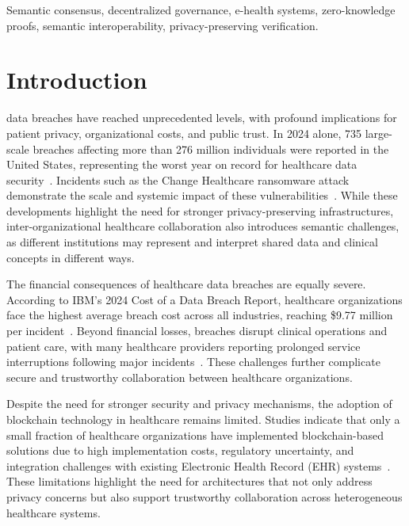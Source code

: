 \documentclass[journal]{IEEEtran}
\begin{document}
\begin{IEEEkeywords}
Semantic consensus, decentralized governance, e-health systems, 
zero-knowledge proofs, semantic interoperability, 
privacy-preserving verification.
\end{IEEEkeywords}

%
\IEEEpeerreviewmaketitle

\section{Introduction}
 data breaches have reached unprecedented levels, with profound implications for patient privacy, organizational costs, and public trust. In 2024 alone, 735 large-scale breaches affecting more than 276 million individuals were reported in the United States, representing the worst year on record for healthcare data security~\cite{HIPAAJournal2024Statistics, HIPAAJournal2024Largest}. Incidents such as the Change Healthcare ransomware attack demonstrate the scale and systemic impact of these vulnerabilities~\cite{HealthcareIT2024}. While these developments highlight the need for stronger privacy-preserving infrastructures, inter-organizational healthcare collaboration also introduces semantic challenges, as different institutions may represent and interpret shared data and clinical concepts in different ways.

The financial consequences of healthcare data breaches are equally severe. According to IBM's 2024 Cost of a Data Breach Report, healthcare organizations face the highest average breach cost across all industries, reaching \$9.77 million per incident~\cite{IBM2024Cost}. Beyond financial losses, breaches disrupt clinical operations and patient care, with many healthcare providers reporting prolonged service interruptions following major incidents~\cite{IBM2024Cost}. These challenges further complicate secure and trustworthy collaboration between healthcare organizations.

Despite the need for stronger security and privacy mechanisms, the adoption of blockchain technology in healthcare remains limited. Studies indicate that only a small fraction of healthcare organizations have implemented blockchain-based solutions due to high implementation costs, regulatory uncertainty, and integration challenges with existing Electronic Health Record (EHR) systems~\cite{Nature2025Blockchain, Healthcare2024Barriers}. These limitations highlight the need for architectures that not only address privacy concerns but also support trustworthy collaboration across heterogeneous healthcare systems.
\end{document}
